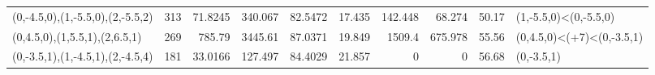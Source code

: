 \begin{tabular}{lrrrrrrrrl}
 (0,-4.5,0),(1,-5.5,0),(2,-5.5,2) &        313 &                           71.8245 &                         340.067 &                           82.5472 &                          17.435 &                           142.448 &                          68.274 &      50.17 & (1,-5.5,0)<(0,-5.5,0)            \\
 (0,4.5,0),(1,5.5,1),(2,6.5,1)    &        269 &                          785.79   &                        3445.61  &                           87.0371 &                          19.849 &                          1509.4   &                         675.978 &      55.56 & (0,4.5,0)<(+7)<(0,-3.5,1)        \\
 (0,-3.5,1),(1,-4.5,1),(2,-4.5,4) &        181 &                           33.0166 &                         127.497 &                           84.4029 &                          21.857 &                             0     &                           0     &      56.68 & (0,-3.5,1)                       \\
\hline
\end{tabular}